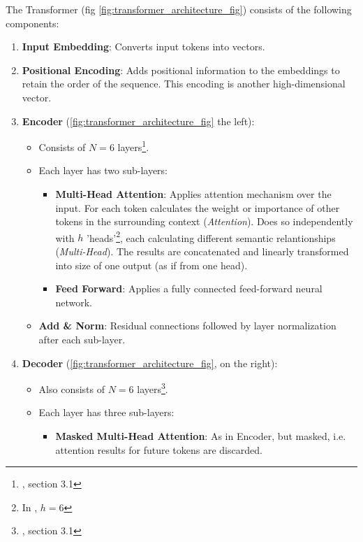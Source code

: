 The Transformer (fig \autoref{fig:transformer_architecture_fig}) consists of the following components:

\begin{enumerate}
	\item \textbf{Input Embedding}: Converts input tokens into vectors.
	\item \textbf{Positional Encoding}: Adds positional information to the embeddings to retain the order of the sequence. This encoding is another high-dimensional vector.
	\item \textbf{Encoder} (\autoref{fig:transformer_architecture_fig} the left):
	      \begin{itemize}
		      \item Consists of \(N = 6\) layers\footnote{\cite{attention_is_all_you_need}, section 3.1}.
		      \item Each layer has two sub-layers:
		            \begin{itemize}
			            \item \textbf{Multi-Head Attention}: Applies attention mechanism over the input. For each token calculates the weight or importance of other tokens in the surrounding context (\textit{Attention}). Does so independently with \(h\) 'heads'\footnote{In \cite{attention_is_all_you_need}, \(h = 6\)}, each calculating different semantic relantionships (\textit{Multi-Head}). The results are concatenated and linearly transformed into size of one output (as if from one head).
			            \item \textbf{Feed Forward}: Applies a fully connected feed-forward neural network.
		            \end{itemize}
		      \item \textbf{Add \& Norm}: Residual connections followed by layer normalization after each sub-layer.
	      \end{itemize}
	\item \textbf{Decoder} (\autoref{fig:transformer_architecture_fig}, on the right):
	      \begin{itemize}
		      \item Also consists of \(N = 6\) layers\footnote{\cite{attention_is_all_you_need}, section 3.1}.
		      \item Each layer has three sub-layers:
		            \begin{itemize}
			            \item \textbf{Masked Multi-Head Attention}: As in Encoder, but masked, i.e. attention results for future tokens are discarded.

\end{itemize}
\end{itemize}
\end{enumerate}
